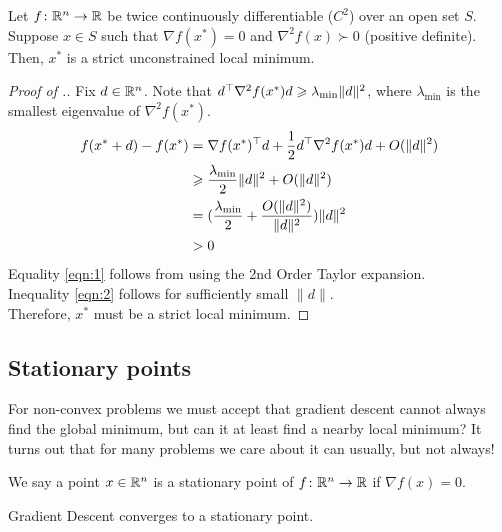 \begin{proposition}
    Let $f\colon \mathbb{R}^n \to \mathbb{R}$ be twice continuously differentiable ($C^2$) over an open set $S$. Suppose $x \in S$ such that $\nabla f(x^*) = 0$ and $\nabla^2f(x) \succ 0$ (positive definite). Then, $x^*$ is a strict unconstrained local minimum.
\end{proposition}

\begin{proof}[Proof of .]
Fix $d \in \mathbb{R}^n$. Note that $d^\top \nabla^2 f(x^*) d \geqslant \lambda_{\text{min}} \|d\|^2$, where $\lambda_\text{min}$ is the smallest eigenvalue of $\nabla^2 f(x^*)$.
\begin{align}
    f(x^* + d) - f(x^*) &= \nabla f(x^*)^\top d + \frac{1}{2}d^\top \nabla^2 f(x^*)d + O(\|d\|^2) \label{eqn:1}\\
    &\geqslant \frac{\lambda_{\text{min}}}{2} \|d\|^2 + O(\|d\|^2) \nonumber\\
    &= (\frac{\lambda_{\text{min}}}{2} + \frac{O(\|d\|^2)}{\|d\|^2}) \|d\|^2 \nonumber\\
    &> 0 \label{eqn:2}
\end{align}
Equality \ref{eqn:1} follows from using the 2nd Order Taylor expansion.\\
Inequality \ref{eqn:2} follows for sufficiently small $\|d\|$.\\ 
\newline
Therefore, $x^*$ must be a strict local minimum.
\end{proof}

\subsection{Stationary points}

For non-convex problems we must accept that gradient descent cannot always find the global minimum, but can it at least find a nearby local minimum? It turns out that for many problems we care about it can usually, but not always!

\begin{definition}
We say a point $x \in \mathbb{R}^n$ is a stationary point of $f\colon \mathbb{R}^n \to \mathbb{R}$ if $\nabla f(x) = 0$.
\end{definition}

\begin{proposition}
Gradient Descent converges to a stationary point.
\end{proposition}

